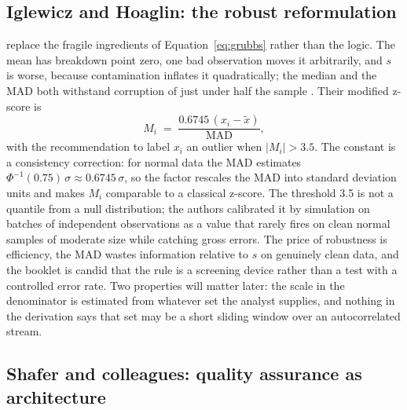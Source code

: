 \subsection{Iglewicz and Hoaglin: the robust reformulation}
\label{sec:tech-ih}

\citet{iglewicz1993} replace the fragile ingredients of
Equation~\eqref{eq:grubbs} rather than the logic. The mean has breakdown
point zero, one bad observation moves it arbitrarily, and $s$ is worse,
because contamination inflates it quadratically; the median and the MAD both
withstand corruption of just under half the sample \citep{hampel1974}. Their
modified z-score is
\begin{equation}
  M_i \;=\; \frac{0.6745\,(x_i - \tilde{x})}{\mathrm{MAD}},
  \label{eq:modz}
\end{equation}
with the recommendation to label $x_i$ an outlier when
$\lvert M_i \rvert > 3.5$. The constant is a consistency correction: for
normal data the MAD estimates $\Phi^{-1}(0.75)\,\sigma \approx 0.6745\,
\sigma$, so the factor rescales the MAD into standard deviation units and
makes $M_i$ comparable to a classical z-score. The threshold 3.5 is not a
quantile from a null distribution; the authors calibrated it by simulation on
batches of independent observations as a value that rarely fires on clean
normal samples of moderate size while catching gross errors. The price of
robustness is efficiency, the MAD wastes information relative to $s$ on
genuinely clean data, and the booklet is candid that the rule is a screening
device rather than a test with a controlled error rate. Two properties will
matter later: the scale in the denominator is estimated from whatever set the
analyst supplies, and nothing in the derivation says that set may be a short
sliding window over an autocorrelated stream.

\subsection{Shafer and colleagues: quality assurance as architecture}
\label{sec:tech-shafer}

